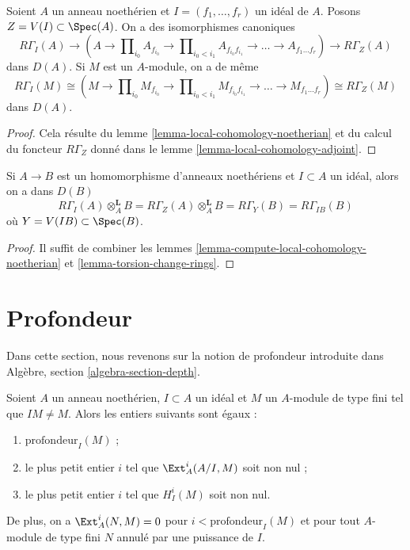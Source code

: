 \begin{lemma}
\label{lemma-compute-local-cohomology-noetherian}
Soient $A$ un anneau noethérien et $I = (f_1, \ldots, f_r)$ un idéal de $A$.
Posons $Z = V(I) \subset \Spec(A)$. On a des isomorphismes canoniques
$$
R\Gamma_I(A) \to
(A \to \prod\nolimits_{i_0} A_{f_{i_0}} \to
\prod\nolimits_{i_0 < i_1} A_{f_{i_0}f_{i_1}} \to
\ldots \to A_{f_1\ldots f_r}) \to R\Gamma_Z(A)
$$
dans $D(A)$. Si $M$ est un $A$-module, on a de même
$$
R\Gamma_I(M) \cong
(M \to \prod\nolimits_{i_0} M_{f_{i_0}} \to
\prod\nolimits_{i_0 < i_1} M_{f_{i_0}f_{i_1}} \to
\ldots \to M_{f_1\ldots f_r}) \cong R\Gamma_Z(M)
$$
dans $D(A)$.
\end{lemma}

\begin{proof}
Cela résulte du lemme \ref{lemma-local-cohomology-noetherian} et du calcul du foncteur $R\Gamma_Z$
donné dans le lemme \ref{lemma-local-cohomology-adjoint}.
\end{proof}

\begin{lemma}
\label{lemma-local-cohomology-change-rings}
Si $A \to B$ est un homomorphisme d'anneaux noethériens et $I \subset A$
un idéal, alors on a dans $D(B)$
$$
R\Gamma_I(A) \otimes_A^\mathbf{L} B =
R\Gamma_Z(A) \otimes_A^\mathbf{L} B =
R\Gamma_Y(B) = R\Gamma_{IB}(B)
$$
où $Y = V(IB) \subset \Spec(B)$.
\end{lemma}

\begin{proof}
Il suffit de combiner les lemmes \ref{lemma-compute-local-cohomology-noetherian} et \ref{lemma-torsion-change-rings}.
\end{proof}






\section{Profondeur}
\label{section-depth}

\noindent
Dans cette section, nous revenons sur la notion de profondeur introduite
dans Algèbre, section \ref{algebra-section-depth}.

\begin{lemma}
\label{lemma-depth}
Soient $A$ un anneau noethérien, $I \subset A$ un idéal
et $M$ un $A$-module de type fini tel que $IM \not = M$.
Alors les entiers suivants sont égaux :
\begin{enumerate}
\item $\text{profondeur}_I(M)$ ;
\item le plus petit entier $i$ tel que $\Ext_A^i(A/I, M)$ soit non nul ;
\item le plus petit entier $i$ tel que $H^i_I(M)$ soit non nul.
\end{enumerate}
De plus, on a $\Ext^i_A(N, M) = 0$ pour $i < \text{profondeur}_I(M)$
et pour tout $A$-module de type fini $N$ annulé par une puissance de $I$.
\end{lemma}

